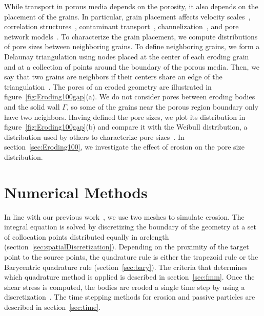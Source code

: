 \documentclass{jfm}
\begin{document}
While transport in porous media depends on the porosity, it also depends
on the placement of the grains.  In particular, grain placement affects
velocity scales~\citep{ali-par-wei-bre2017}, correlation
structures~\citep{leb-ded-dav-bou2007}, contaminant
transport~\citep{knu-car2005},
channelization~\citep{sie-ili-pri-riv-gua2019,berhanu2012shape}, and
pore network models~\citep{bry-kin-mel1993, bry-mel-cad1993,
bij-blu2006}. To characterize the grain placement, we compute
distributions of pore sizes between neighboring grains.  To define
neighboring grains, we form a Delaunay triangulation using nodes placed
at the center of each eroding grain and at a collection of points around
the boundary of the porous media.  Then, we say that two grains are
neighbors if their centers share an edge of the
triangulation~\citep{dea-qua-bir-jua2018}. The pores of an eroded
geometry are illustrated in figure~\ref{fig:Eroding100gap}(a). We do not
consider pores between eroding bodies and the solid wall $\Gamma$, so
some of the grains near the porous region boundary only have two
neighbors. Having defined the pore sizes, we plot its distribution in
figure~\ref{fig:Eroding100gap}(b) and compare it with the Weibull
distribution, a distribution used by others to characterize pore
sizes~\citep{ioa-cha1993}.  In section~\ref{sec:Eroding100}, we
investigate the effect of erosion on the pore size distribution.


\section{Numerical Methods}
\label{sec:method}
In line with our previous work~\citep{qua-moo2018}, we use two meshes to
simulate erosion. The integral equation is solved by discretizing the
boundary of the geometry at a set of collocation points distributed
equally in arclength (section~\ref{sec:spatialDiscretization}).
Depending on the proximity of the target point to the source points, the
quadrature rule is either the trapezoid rule or the Barycentric
quadrature rule (section~\ref{sec:bary}).  The criteria that determines
which quadrature method is applied is described in
section~\ref{sec:fmm}.  Once the shear stress is computed, the bodies
are eroded a single time step by using a {\thL}
discretization~\citep{hou-low-she1994, moore2013self}.  The time
stepping methods for erosion and passive particles are described in
section~\ref{sec:time}.
\end{document}
